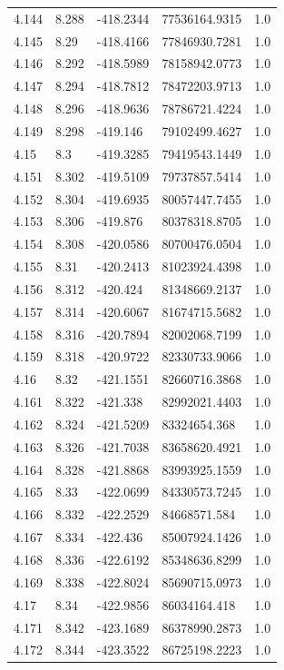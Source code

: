\begin{tabular}{lllll}
4.144 & 8.288 & -418.2344 & 77536164.9315 & 1.0 \\
4.145 & 8.29 & -418.4166 & 77846930.7281 & 1.0 \\
4.146 & 8.292 & -418.5989 & 78158942.0773 & 1.0 \\
4.147 & 8.294 & -418.7812 & 78472203.9713 & 1.0 \\
4.148 & 8.296 & -418.9636 & 78786721.4224 & 1.0 \\
4.149 & 8.298 & -419.146 & 79102499.4627 & 1.0 \\
4.15 & 8.3 & -419.3285 & 79419543.1449 & 1.0 \\
4.151 & 8.302 & -419.5109 & 79737857.5414 & 1.0 \\
4.152 & 8.304 & -419.6935 & 80057447.7455 & 1.0 \\
4.153 & 8.306 & -419.876 & 80378318.8705 & 1.0 \\
4.154 & 8.308 & -420.0586 & 80700476.0504 & 1.0 \\
4.155 & 8.31 & -420.2413 & 81023924.4398 & 1.0 \\
4.156 & 8.312 & -420.424 & 81348669.2137 & 1.0 \\
4.157 & 8.314 & -420.6067 & 81674715.5682 & 1.0 \\
4.158 & 8.316 & -420.7894 & 82002068.7199 & 1.0 \\
4.159 & 8.318 & -420.9722 & 82330733.9066 & 1.0 \\
4.16 & 8.32 & -421.1551 & 82660716.3868 & 1.0 \\
4.161 & 8.322 & -421.338 & 82992021.4403 & 1.0 \\
4.162 & 8.324 & -421.5209 & 83324654.368 & 1.0 \\
4.163 & 8.326 & -421.7038 & 83658620.4921 & 1.0 \\
4.164 & 8.328 & -421.8868 & 83993925.1559 & 1.0 \\
4.165 & 8.33 & -422.0699 & 84330573.7245 & 1.0 \\
4.166 & 8.332 & -422.2529 & 84668571.584 & 1.0 \\
4.167 & 8.334 & -422.436 & 85007924.1426 & 1.0 \\
4.168 & 8.336 & -422.6192 & 85348636.8299 & 1.0 \\
4.169 & 8.338 & -422.8024 & 85690715.0973 & 1.0 \\
4.17 & 8.34 & -422.9856 & 86034164.418 & 1.0 \\
4.171 & 8.342 & -423.1689 & 86378990.2873 & 1.0 \\
4.172 & 8.344 & -423.3522 & 86725198.2223 & 1.0 \\

\end{tabular}
